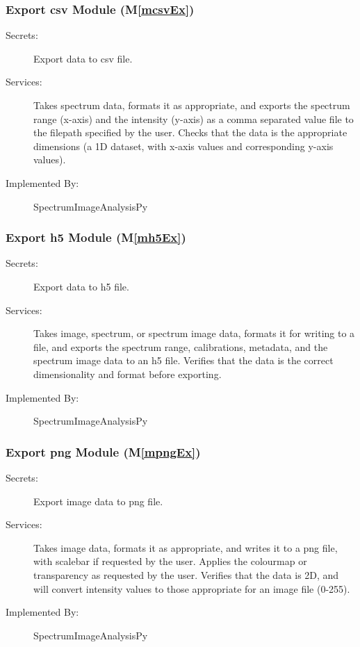 \documentclass[12pt, titlepage]{article}
\newcommand{\mref}[1]{M\ref{#1}}
\newcommand{\progname}{SpectrumImageAnalysisPy}
\begin{document}
\subsubsection{Export csv Module (\mref{mcsvEx})}
\begin{description}
	\item[Secrets:]Export data to csv file.
	\item[Services:]Takes spectrum data, formats it as appropriate, and exports the
spectrum range (x-axis) and the intensity (y-axis) as a comma separated value
file to the filepath specified by the user. Checks that the data is the
appropriate dimensions (a 1D dataset, with x-axis values and corresponding
y-axis values).
	\item[Implemented By:] \progname
\end{description}

\subsubsection{Export h5 Module (\mref{mh5Ex})}
\begin{description}
	\item[Secrets:]Export data to h5 file.
	\item[Services:]Takes image, spectrum, or spectrum image data, formats it for
writing to a file, and exports the spectrum range, calibrations, metadata, and
the spectrum image data to an h5 file. Verifies that the data is the correct
dimensionality and format before exporting.
	\item[Implemented By:] \progname
\end{description}

\subsubsection{Export png Module (\mref{mpngEx})}
\begin{description}
	\item[Secrets:]Export image data to png file.
	\item[Services:]Takes image data, formats it as appropriate, and writes it to a
png file, with scalebar if requested by the user. Applies the colourmap or
transparency as requested by the user. Verifies that the data is 2D, and will
convert intensity values to those appropriate for an image file (0-255).
	\item[Implemented By:] \progname
\end{description}
\end{document}
